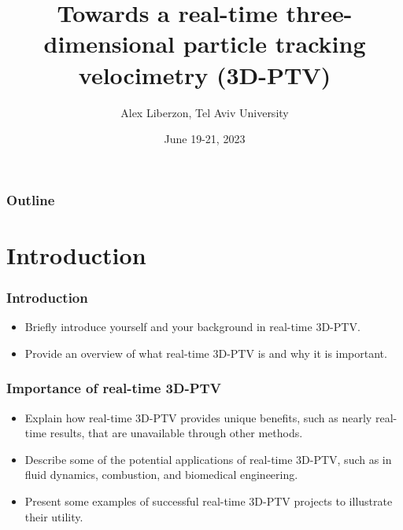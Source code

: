\documentclass[aspectratio=43]{beamer}
\title{Towards a real-time three-dimensional particle tracking velocimetry (3D-PTV)}
\date{June 19-21, 2023}
\author[Liberzon]{Alex Liberzon, Tel Aviv University}
\begin{document}
\begin{frame}
    \titlepage
\end{frame}

\begin{frame}\frametitle{Outline}
    \begin{card}	
    \tableofcontents
    \end{card}
\end{frame}


\section{Introduction}

\begin{frame}
\frametitle{Introduction}
\begin{itemize}
\item Briefly introduce yourself and your background in real-time 3D-PTV.
\item Provide an overview of what real-time 3D-PTV is and why it is important.
\end{itemize}
\end{frame}




\begin{frame}
\frametitle{Importance of real-time 3D-PTV}
\begin{itemize}
\item Explain how real-time 3D-PTV provides unique benefits, such as nearly real-time results, that are unavailable through other methods.
\item Describe some of the potential applications of real-time 3D-PTV, such as in fluid dynamics, combustion, and biomedical engineering.
\item Present some examples of successful real-time 3D-PTV projects to illustrate their utility.
\end{itemize}
\end{frame}
\end{document}
